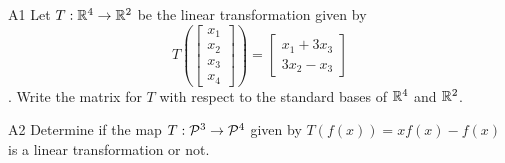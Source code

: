 \documentclass{sbgLAquiz}
\begin{document}
\begin{problem}{A1}
Let $T: \IR^4 \rightarrow \IR^2$ be the linear transformation given by $$T\left(\begin{bmatrix} x_1 \\ x_2 \\ x_3 \\ x_4 \end{bmatrix} \right) = \begin{bmatrix} x_1+3x_3 \\ 3x_2-x_3 \end{bmatrix}$$. Write the matrix for $T$ with respect to the standard bases of $\IR^4$ and $\IR^2$.
\end{problem}
\newpage

\begin{problem}{A2}
Determine if the map $T: \P^3 \rightarrow \P^4$ given by $T(f(x))=xf(x)-f(x)$ is a linear transformation or not.
\end{problem}
\end{document}
